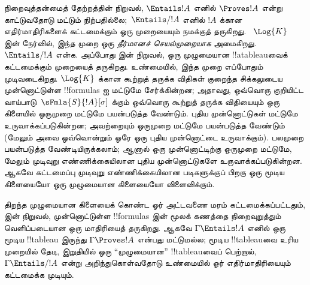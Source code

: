 \documentclass[../../../include/open-logic-section]{subfiles}
\begin{document}


\begin{explain}
  நிறைவுத்தன்மைத் தேற்றத்தின் நிறுவல், $\Entails !A$ எனில் $\Proves !A$
  என்று காட்டுவதோடு மட்டும் நிற்பதில்லை;~$\Entails/ !A$ எனில்
  $!A$ க்கான எதிர்மாதிரிகளைக் கட்டமைக்கும் ஒரு முறையையும் நமக்குத் தருகிறது.
  ~$\Log{K}$ இன் நேர்வில், இந்த முறை ஒரு \emph{தீர்மானச் செயல்முறையாக}
  அமைகிறது. $\Entails/ !A$ என்க. அப்போது
   இன் நிறுவல், ஒரு முழுமையான
  !!a{tableau}வைக் கட்டமைக்கும் முறையைத் தருகிறது. உண்மையில், இந்த முறை
  எப்போதும் முடிவடைகிறது. $\Log{K}$ க்கான கூற்றுத் தருக்க விதிகள் குறைந்த
  சிக்கலுடைய முன்னொட்டுள்ள !!{formula}s ஐ மட்டுமே சேர்க்கின்றன; அதாவது,
  ஒவ்வொரு குறியிட்ட வாய்பாடு~$\sFmla{S}{!A}[\sigma]$ க்கும் ஒவ்வொரு
  கூற்றுத் தருக்க விதியையும் ஒரு கிளையில் ஒருமுறை மட்டுமே பயன்படுத்த வேண்டும்.
  புதிய முன்னொட்டுகள்
   மட்டுமே
  உருவாக்கப்படுகின்றன; அவற்றையும் ஒருமுறை மட்டுமே பயன்படுத்த வேண்டும் (மேலும்
  அவை ஒவ்வொன்றும் ஒரே ஒரு புதிய முன்னொட்டை உருவாக்கும்).
   பலமுறை பயன்படுத்த
  வேண்டியிருக்கலாம்; ஆனால் ஒரு முன்னொட்டிற்கு
  ஒருமுறை மட்டுமே, மேலும் முடிவுறு எண்ணிக்கையிலான புதிய முன்னொட்டுகளே
  உருவாக்கப்படுகின்றன. ஆகவே கட்டமைப்பு முடிவுறு எண்ணிக்கையிலான படிகளுக்குப்
  பிறகு ஒரு மூடிய கிளையையோ ஒரு முழுமையான கிளையையோ விளைவிக்கும்.

  திறந்த முழுமையான கிளையைக் கொண்ட ஓர் அட்டவணை மரம் கட்டமைக்கப்பட்டதும்,
   இன் நிறுவல், முன்னொட்டுள்ள
  !!{formula}s இன் மூலக் கணத்தை நிறைவுறுத்தும் வெளிப்படையான ஒரு மாதிரியைத்
  தருகிறது. ஆகவே $\Gamma \Entails !A$ எனில் ஒரு மூடிய !!{tableau} இருந்து
  $\Gamma \Proves !A$ என்பது மட்டுமல்ல; மூடிய !!{tableau}வை உரிய முறையில்
  தேடி, இறுதியில் ஒரு ``முழுமையான'' !!{tableau}வைப் பெற்றால்,
  $\Gamma \Entails/ !A$ என்று அறிந்துகொள்வதோடு உண்மையில் ஓர்
  எதிர்மாதிரியையும் கட்டமைக்க முடியும்.
\end{explain}
\end{document}
